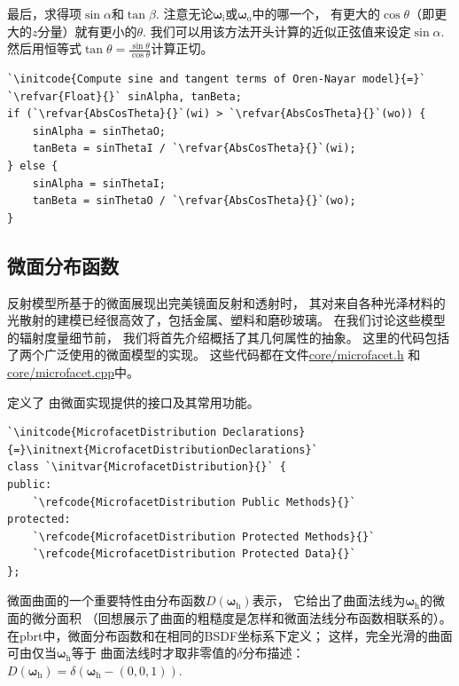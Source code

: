 最后，求得项$\sin\alpha$和$\tan\beta$.
注意无论${\bm\omega}_{\mathrm{i}}$或${\bm\omega}_{\mathrm{o}}$中的哪一个，
有更大的$\cos\theta$（即更大的$z$分量）就有更小的$\theta$.
我们可以用该方法开头计算的近似正弦值来设定$\sin\alpha$.
然后用恒等式$\displaystyle\tan\theta=\frac{\sin\theta}{\cos\theta}$计算正切。
\begin{lstlisting}
`\initcode{Compute sine and tangent terms of Oren-Nayar model}{=}`
`\refvar{Float}{}` sinAlpha, tanBeta;
if (`\refvar{AbsCosTheta}{}`(wi) > `\refvar{AbsCosTheta}{}`(wo)) {
    sinAlpha = sinThetaO;
    tanBeta = sinThetaI / `\refvar{AbsCosTheta}{}`(wi);
} else {
    sinAlpha = sinThetaI;
    tanBeta = sinThetaO / `\refvar{AbsCosTheta}{}`(wo);
}
\end{lstlisting}

\subsection{微面分布函数}\label{sub:微面分布函数}
反射模型所基于的微面展现出完美镜面反射和透射时，
其对来自各种光泽材料的光散射的建模已经很高效了，包括金属、塑料和磨砂玻璃。
在我们讨论这些模型的辐射度量细节前，
我们将首先介绍概括了其几何属性的抽象。
这里的代码包括了两个广泛使用的微面模型的实现。
这些代码都在文件\href{https://github.com/mmp/pbrt-v3/tree/master/src/core/microfacet.h}{\ttfamily core/microfacet.h}
和\href{https://github.com/mmp/pbrt-v3/tree/master/src/core/microfacet.cpp}{\ttfamily core/microfacet.cpp}中。

定义了
由微面实现提供的接口及其常用功能。
\begin{lstlisting}
`\initcode{MicrofacetDistribution Declarations}{=}\initnext{MicrofacetDistributionDeclarations}`
class `\initvar{MicrofacetDistribution}{}` {
public:
    `\refcode{MicrofacetDistribution Public Methods}{}`
protected:
    `\refcode{MicrofacetDistribution Protected Methods}{}`
    `\refcode{MicrofacetDistribution Protected Data}{}`
};
\end{lstlisting}

微面曲面的一个重要特性由分布函数$D({\bm\omega}_{\mathrm{h}})$表示，
它给出了曲面法线为${\bm\omega}_{\mathrm{h}}$的微面的微分面积
（回想展示了曲面的粗糙度是怎样和微面法线分布函数相联系的）。
在pbrt中，微面分布函数和在相同的BSDF坐标系下定义；
这样，完全光滑的曲面可由仅当${\bm\omega}_{\mathrm{h}}$等于
曲面法线时才取非零值的$\delta$分布描述：$D({\bm\omega}_{\mathrm{h}})=\delta({\bm\omega}_{\mathrm{h}}-(0,0,1))$.

